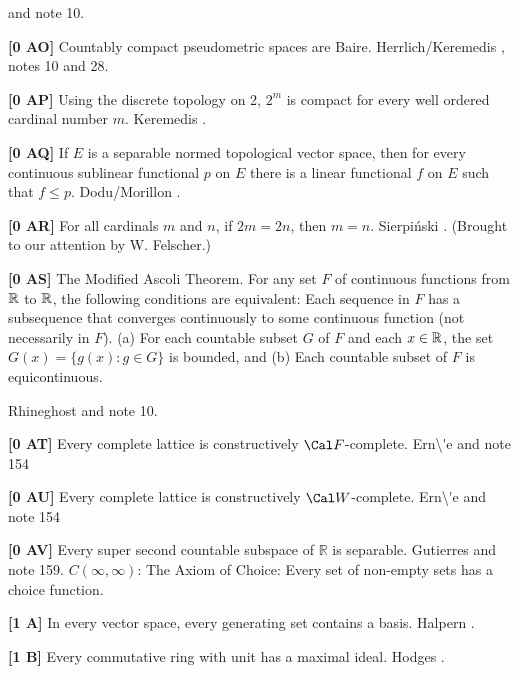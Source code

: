and note 10.
\smallskip
\item{}{\bf [0 AO]} Countably compact pseudometric spaces are Baire.
\ac{Herrlich/Keremedis} \cite{1999a}, notes 10 and 28.
\smallskip
\item{}{\bf [0 AP]} Using the discrete topology on 2, $2^m$ is
compact for every well ordered cardinal number $m$. \ac{Keremedis}
\cite{1999b}.
\smallskip
\item{}{\bf [0 AQ]} If $E$ is a separable normed topological vector
space, then for every continuous sublinear functional $p$ on $E$
there is a linear functional $f$ on $E$ such that $f\leq p$.
\ac{Dodu/Morillon} \cite{1999}.
\smallskip
\item{}{\bf [0 AR]} For all cardinals $m$ and $n$, if $2m=2n$,
then $m=n$. Sierpi\'nski \cite{1922}. (Brought to our attention
by W. Felscher.)
\smallskip
\item{}{\bf [0 AS]} The Modified Ascoli Theorem.  For any set $F$ of
continuous functions from $\Bbb R$ to $\Bbb R$, the following
conditions are equivalent:
 Each sequence in $F$ has a subsequence that
converges continuously to some continuous function (not
necessarily in $F$).
 (a)  For each countable subset $G$ of $F$ and each
$x\in {\Bbb R}$, the set $G(x) = \{ g(x) : g\in G\}$ is bounded,
and
\itemitem{} (b) Each countable subset of $F$ is equicontinuous.\par
\ac{Rhineghost} \cite{2000} and note 10. 
\smallskip
\item{}{\bf [0 AT]} Every complete lattice is constructively $\Cal
F$-complete.  \ac{Ern\'e} \cite{2000} and note 154
\smallskip
\item{}{\bf [0 AU]} Every complete lattice is constructively $\Cal
W$-complete.  \ac{Ern\'e} \cite{2000} and note 154
\smallskip
\item{}{\bf [0 AV]} Every super second countable subspace of $\mathbb R$
is separable.  \ac{Gutierres} \cite{2004} and note 159. 
\medskip
\medskip
{} $C(\infty,\infty)$:  The Axiom of Choice:
Every  set  of  non-empty sets has a choice function.
\smallskip
\item{}{\bf [1 A]} In every vector space, every generating set
contains a basis.  \ac{Halpern} \cite{1966}.
\smallskip
\item{}{\bf [1 B]}  Every commutative ring with unit has a maximal ideal.
\ac{Hodges} \cite{1979}.
